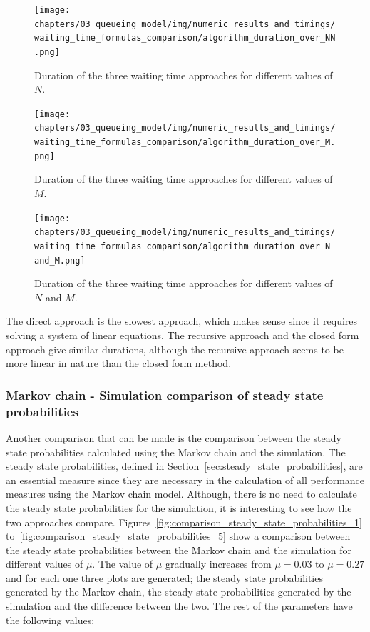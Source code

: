 \begin{figure}[H]
    \texttt{[image: chapters/03\_queueing\_model/img/numeric\_results\_and\_timings/waiting\_time\_formulas\_comparison/algorithm\_duration\_over\_NN.png]}
    \caption{Duration of the three waiting time approaches for different values
    of \(N\).}
    \label{fig:waiting_time_algorithm_duration_over_N}
\end{figure}

\begin{figure}[H]
    \texttt{[image: chapters/03\_queueing\_model/img/numeric\_results\_and\_timings/waiting\_time\_formulas\_comparison/algorithm\_duration\_over\_M.png]}
    \caption{Duration of the three waiting time approaches for different values
    of \(M\).}
    \label{fig:waiting_time_algorithm_duration_over_M}
\end{figure}


\begin{figure}[H]
    \texttt{[image: chapters/03\_queueing\_model/img/numeric\_results\_and\_timings/waiting\_time\_formulas\_comparison/algorithm\_duration\_over\_N\_and\_M.png]}
    \caption{Duration of the three waiting time approaches for different values
    of \(N\) and \(M\).}
    \label{fig:waiting_time_algorithm_duration_over_N_and_M}
\end{figure}

The direct approach is the slowest approach, which makes sense since it requires
solving a system of linear equations.
The recursive approach and the closed form approach give similar durations,
although the recursive approach seems to be more linear in nature than the
closed form method. 


\subsubsection{Markov chain - Simulation comparison of steady state probabilities}

Another comparison that can be made is the comparison between the steady state
probabilities calculated using the Markov chain and the simulation.
The steady state probabilities, defined in
Section~\ref{sec:steady_state_probabilities}, are an essential measure since
they are necessary in the calculation of all performance measures using the
Markov chain model.
Although, there is no need to calculate the steady state probabilities for the
simulation, it is interesting to see how the two approaches compare.
Figures~\ref{fig:comparison_steady_state_probabilities_1}
to~\ref{fig:comparison_steady_state_probabilities_5} show a comparison between
the steady state probabilities between the Markov chain and the simulation
for different values of \(\mu\).
The value of \(\mu\) gradually increases from \(\mu = 0.03\) to \(\mu = 0.27\)
and for each one three plots are generated; the steady state probabilities
generated by the Markov chain, the steady state probabilities generated by the
simulation and the difference between the two.
The rest of the parameters have the following values:

